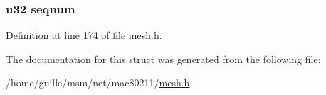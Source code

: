 \hypertarget{structrmc__entry_aa1de03f6f57c53b7e53eb6f83507da76}{
\subsubsection[{seqnum}]{\setlength{\rightskip}{0pt plus 5cm}u32 seqnum}}\label{structrmc__entry_aa1de03f6f57c53b7e53eb6f83507da76}


Definition at line 174 of file mesh.\-h.



The documentation for this struct was generated from the following file\-:\begin{DoxyCompactItemize}
\item 
/home/guille/msm/net/mac80211/\hyperlink{mesh_8h}{mesh.\-h}\end{DoxyCompactItemize}
